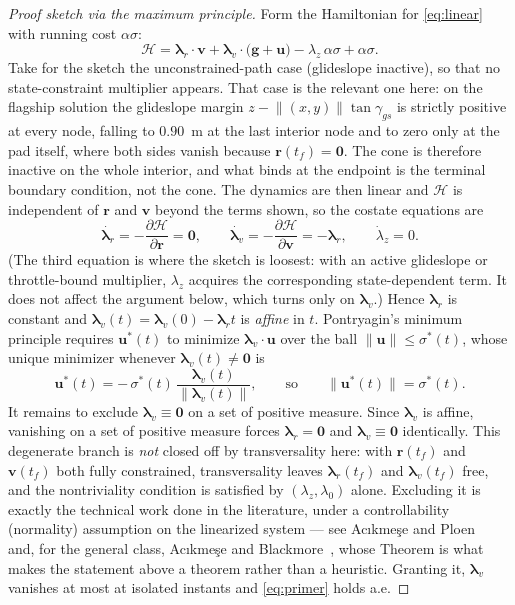 \documentclass[11pt]{article}
\newcommand{\rvec}{\mathbf{r}}
\newcommand{\vvec}{\mathbf{v}}
\newcommand{\uvec}{\mathbf{u}}
\newcommand{\gvec}{\mathbf{g}}
\newcommand{\lamv}{\boldsymbol{\lambda}_v}
\newcommand{\lamr}{\boldsymbol{\lambda}_r}
\begin{document}
\begin{proof}[Proof sketch via the maximum principle]
Form the Hamiltonian for \eqref{eq:linear} with running cost $\alpha\sigma$:
%
\begin{equation}
\mathcal{H} = \lamr\!\cdot\! \vvec
 + \lamv\!\cdot\!\big(\gvec + \uvec\big)
 - \lambda_z\, \alpha \sigma
 + \alpha \sigma .
\end{equation}
%
Take for the sketch the unconstrained-path case (glideslope inactive), so
that no state-constraint multiplier appears. That case is the relevant one
here: on the flagship solution the glideslope margin
$z - \lVert(x,y)\rVert\tan\gamma_{gs}$ is strictly positive at every node,
falling to $0.90$~m at the last interior node and to zero only at the pad
itself, where both sides vanish because $\rvec(t_f) = \mathbf{0}$. The cone
is therefore inactive on the whole interior, and what binds at the endpoint
is the terminal boundary condition, not the cone. The dynamics are then linear
and $\mathcal{H}$ is independent of $\rvec$ and $\vvec$ beyond the terms
shown, so the costate equations are
%
\begin{equation}
\dot{\lamr} = -\frac{\partial \mathcal{H}}{\partial \rvec} = \mathbf{0},
\qquad
\dot{\lamv} = -\frac{\partial \mathcal{H}}{\partial \vvec} = -\lamr,
\qquad
\dot{\lambda}_z = 0 .
\end{equation}
%
(The third equation is where the sketch is loosest: with an active
glideslope or throttle-bound multiplier, $\lambda_z$ acquires the
corresponding state-dependent term. It does not affect the argument below,
which turns only on $\lamv$.)
Hence $\lamr$ is constant and $\lamv(t) = \lamv(0) - \lamr t$ is
\emph{affine} in $t$. Pontryagin's minimum principle requires
$\uvec^\ast(t)$ to minimize $\lamv\!\cdot\!\uvec$ over the ball
$\lVert\uvec\rVert \le \sigma^\ast(t)$, whose unique minimizer whenever
$\lamv(t) \ne \mathbf{0}$ is
%
\begin{equation}
\uvec^\ast(t) = -\,\sigma^\ast(t)\, \frac{\lamv(t)}{\lVert \lamv(t)\rVert},
\qquad\text{so}\qquad
\lVert \uvec^\ast(t)\rVert = \sigma^\ast(t).
\label{eq:primer}
\end{equation}
%
It remains to exclude $\lamv \equiv \mathbf{0}$ on a set of positive
measure. Since $\lamv$ is affine, vanishing on a set of positive measure
forces $\lamr = \mathbf{0}$ and $\lamv \equiv \mathbf{0}$ identically. This
degenerate branch is \emph{not} closed off by transversality here: with
$\rvec(t_f)$ and $\vvec(t_f)$ both fully constrained, transversality leaves
$\lamr(t_f)$ and $\lamv(t_f)$ free, and the nontriviality condition is
satisfied by $(\lambda_z, \lambda_0)$ alone. Excluding it is exactly the
technical work done in the literature, under a controllability (normality)
assumption on the linearized system --- see Ac\i kme\c{s}e and
Ploen~\cite{acikmese2007} and, for the general class, Ac\i kme\c{s}e and
Blackmore~\cite{acikmese2011}, whose Theorem is what makes the statement
above a theorem rather than a heuristic. Granting it, $\lamv$ vanishes at
most at isolated instants and \eqref{eq:primer} holds a.e.
\end{proof}
\end{document}
